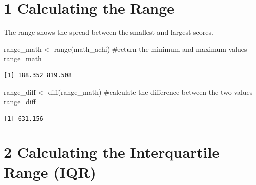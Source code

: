 \documentclass[
  letterpaper,
  DIV=11,
  numbers=noendperiod]{scrreprt}
\newenvironment{Shaded}{\begin{snugshade}}{\end{snugshade}}
\newcommand{\CommentTok}[1]{\textcolor[rgb]{0.37,0.37,0.37}{#1}}
\newcommand{\FunctionTok}[1]{\textcolor[rgb]{0.28,0.35,0.67}{#1}}
\newcommand{\NormalTok}[1]{\textcolor[rgb]{0.00,0.23,0.31}{#1}}
\newcommand{\OtherTok}[1]{\textcolor[rgb]{0.00,0.23,0.31}{#1}}
\newcommand{\SpecialCharTok}[1]{\textcolor[rgb]{0.37,0.37,0.37}{#1}}
\newcommand{\StringTok}[1]{\textcolor[rgb]{0.13,0.47,0.30}{#1}}
\begin{document}
\begin{Shaded}
\end{Shaded}

\section*{1 Calculating the Range}\label{calculating-the-range}


The range shows the spread between the smallest and largest scores.

\begin{Shaded}
\begin{Highlighting}[]
\NormalTok{range\_math }\OtherTok{\textless{}{-}} \FunctionTok{range}\NormalTok{(math\_achi) }\CommentTok{\#return the minimum and maximum values }
\NormalTok{range\_math }
\end{Highlighting}
\end{Shaded}

\begin{verbatim}
[1] 188.352 819.508
\end{verbatim}

\begin{Shaded}
\begin{Highlighting}[]
\NormalTok{range\_diff }\OtherTok{\textless{}{-}} \FunctionTok{diff}\NormalTok{(range\_math) }\CommentTok{\#calculate the difference between the two values }
\NormalTok{range\_diff }
\end{Highlighting}
\end{Shaded}

\begin{verbatim}
[1] 631.156
\end{verbatim}

\section*{2 Calculating the Interquartile Range
(IQR)}\label{calculating-the-interquartile-range-iqr}
\end{document}
